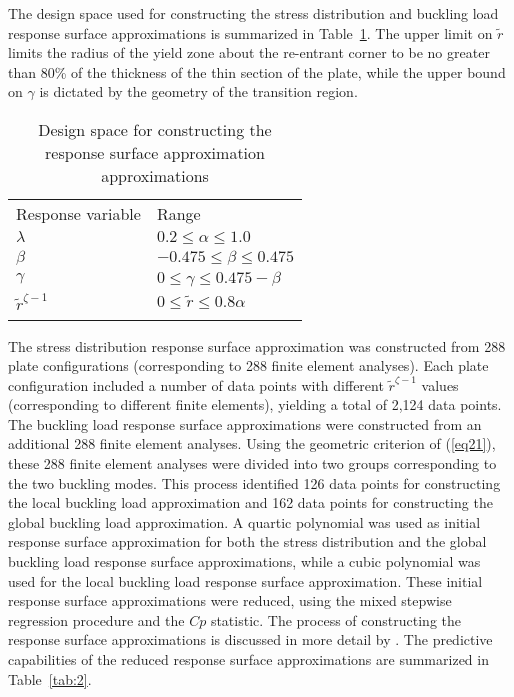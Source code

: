 \documentclass[stropt]{svjour}
\begin{document}
The design space used for constructing the stress distribution and buckling
load response surface approximations is summarized in Table~\ref{tab:1}.
The upper limit on $\tilde{r}$ limits the radius of the yield zone about the
re-entrant corner to be no greater than 80\% of the thickness of the thin
section of the plate, while the upper bound on $\gamma$ is dictated by the
geometry of the transition region.

\begin{table}[htbp]
\caption{Design space for constructing the response surface approximation
approximations\hsize=164pt}
\label{tab:1}
\tabcolsep=10pt
\begin{tabular}{@{}ll@{}}
\hline\noalign{\smallskip}
Response variable & Range \\
\noalign{\smallskip}\hline\hline\noalign{\smallskip}
$\lambda$ & $0.2\leq \alpha\leq 1.0$ \\
$\beta$ & $-0.475\leq \beta\leq 0.475$ \\
$\gamma$ & $0\leq \gamma\leq 0.475-\beta$ \\
$\tilde{r}^{\zeta-1}$ & $0\leq \tilde{r}\leq 0.8\alpha$ \\
\noalign{\smallskip}\hline
\end{tabular}
\end{table}

The stress distribution response surface approximation was constructed from
288 plate configurations (corresponding to 288 finite element analyses).
Each plate configuration included a number of data points with different
$\tilde{r}^{\zeta-1}$ values (corresponding to different finite elements),
yielding a total of 2,124 data points.
The buckling load response surface approximations were constructed from an
additional 288 finite element analyses.
Using the geometric criterion of (\ref{eq21}), these 288 finite element
analyses were divided into two groups corresponding to the two buckling modes.
This process identified 126 data points for constructing the local buckling
load approximation and 162 data points for constructing the global buckling
load approximation.
A quartic polynomial was used as initial response surface approximation for
both the stress distribution and the global buckling load response surface
approximations, while a cubic polynomial was used for the local buckling load
response surface approximation.
These initial response surface approximations were reduced, using the mixed
stepwise regression procedure and the $Cp$ statistic.
The process of constructing the response surface approximations is discussed
in more detail by \cite{Venter97}.
The predictive capabilities of the reduced response surface approximations are
summarized in Table~\ref{tab:2}.
\end{document}
